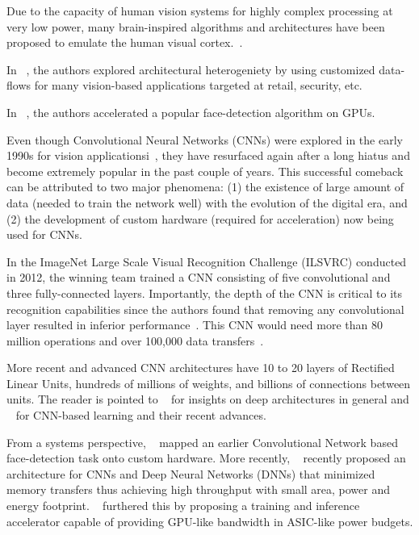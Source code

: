 
Due to the capacity of human vision systems for highly complex processing at very low power, many brain-inspired algorithms and architectures have been proposed to emulate the human visual cortex.~\cite{Nere2011,Chen2014,Kestur2012}. %

In ~\cite{HPCA2015}, the authors explored architectural heterogeniety by using customized data-flows for many vision-based applications targeted at retail, security, etc.

In ~\cite{violafccm}, the authors accelerated a popular face-detection algorithm on GPUs.

Even though Convolutional Neural Networks (CNNs) were explored in the early 1990s for vision applicationsi~\cite{giles1997}, they have resurfaced again after a long hiatus and become extremely popular in the past couple of years. 
This successful comeback can be attributed to two major phenomena:
(1) the existence of large amount of data (needed to train the network well) with the evolution of the digital era, and (2) the development of 
custom hardware (required for acceleration) now being used for CNNs. 

In the ImageNet Large Scale Visual Recognition Challenge (ILSVRC)
conducted in 2012, the winning team trained a CNN consisting of five convolutional and three fully-connected layers. Importantly, the depth of the CNN is critical to 
its recognition capabilities since the authors found that removing any convolutional layer resulted in inferior performance~\cite{NIPS2012}. This CNN would need
more than 80 million operations and over 100,000 data transfers~\cite{XilinxCNN}.

More recent and advanced CNN architectures have 10 to 20 layers of Rectified Linear Units, hundreds of millions of weights, and billions of connections between units.
The reader is pointed to ~\cite{Bengio2009} for insights on deep architectures in general and ~\cite{DNNNature2015} for CNN-based learning and their recent advances. 

From a systems perspective, ~\cite{Farabet2009} mapped an earlier Convolutional Network based face-detection task onto custom hardware. More recently, ~\cite{Chen2014} recently proposed an architecture for CNNs and Deep 
Neural Networks (DNNs) that minimized memory transfers thus achieving high
throughput with small area, power and energy footprint. ~\cite{DaDianNao} furthered this by proposing a training and inference accelerator 
capable of providing GPU-like bandwidth in ASIC-like power budgets.

